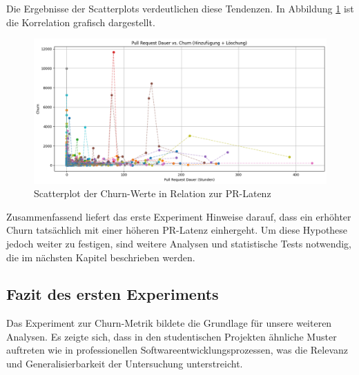 Die Ergebnisse der Scatterplots verdeutlichen diese Tendenzen. In Abbildung \ref{fig:pr-latency-churn-added-plus-deleting} ist die Korrelation grafisch dargestellt.


\begin{figure}[th]
\centering
\includegraphics[width=\textwidth]{Figures/pr-latency-churn.png}
\decoRule
\caption{Scatterplot der Churn-Werte in Relation zur PR-Latenz}
\label{fig:pr-latency-churn-added-plus-deleting}
\end{figure}


Zusammenfassend liefert das erste Experiment Hinweise darauf, dass ein erhöhter Churn tatsächlich mit einer höheren PR-Latenz einhergeht. Um diese Hypothese jedoch weiter zu festigen, sind weitere Analysen und statistische Tests notwendig, die im nächsten Kapitel beschrieben werden.


\subsection{Fazit des ersten Experiments}

Das Experiment zur Churn-Metrik bildete die Grundlage für unsere weiteren Analysen. Es zeigte sich, dass in den studentischen Projekten ähnliche Muster auftreten wie in professionellen Softwareentwicklungsprozessen, was die Relevanz und Generalisierbarkeit der Untersuchung unterstreicht.